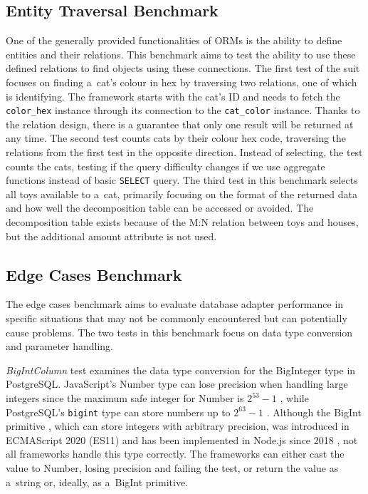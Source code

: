 \subsection{Entity Traversal Benchmark}
One of the generally provided functionalities of ORMs is the ability to define
entities and their relations. This benchmark aims to test the ability to use
these defined relations to find objects using these connections. The first test
of the suit focuses on finding a~cat's colour in hex by traversing two
relations, one of which is identifying. The framework starts with the cat's ID
and needs to fetch the \texttt{color\_hex} instance through its connection to
the \texttt{cat\_color} instance. Thanks to the relation design, there is a
guarantee that only one result will be returned at any time. The second test
counts cats by their colour hex code, traversing the relations from the first
test in the opposite direction. Instead of selecting, the test counts the cats,
testing if the query difficulty changes if we use aggregate functions instead of
basic \texttt{SELECT} query. The third test in this benchmark selects all toys
available to a~cat, primarily focusing on the format of the returned data and
how well the decomposition table can be accessed or avoided. The decomposition
table exists because of the M:N relation between toys and houses, but the
additional amount attribute is not used.

\subsection{Edge Cases Benchmark}

The edge cases benchmark aims to evaluate database adapter performance in
specific situations that may not be commonly encountered but can potentially
cause problems. The two tests in this benchmark focus on data type conversion
and parameter handling.

\textit{BigIntColumn} test examines the data type conversion for the BigInteger
type in PostgreSQL. JavaScript's Number type can lose precision when handling
large integers since the maximum safe integer for Number is \(2^{53} - 1\)
\cite{MDNNumber}, while PostgreSQL's \texttt{bigint} type can store numbers up
to \(2^{63} - 1\) \cite{PostgresNumeric}. Although the BigInt primitive
\cite{MDNBigInt}, which can store integers with arbitrary precision, was
introduced in ECMAScript 2020 (ES11) \cite{ecma-262} and has been implemented in
Node.js since 2018 \cite{MDNBigInt}, not all frameworks handle this type
correctly. The frameworks can either cast the value to Number, losing precision
and failing the test, or return the value as a~string or, ideally, as a~BigInt
primitive.

